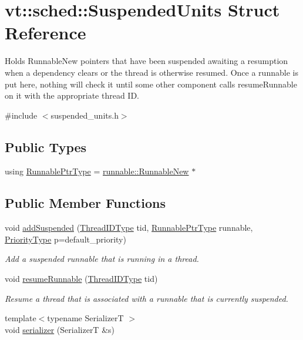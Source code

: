 \hypertarget{structvt_1_1sched_1_1_suspended_units}{}\section{vt\+:\+:sched\+:\+:Suspended\+Units Struct Reference}
\label{structvt_1_1sched_1_1_suspended_units}


Holds {\ttfamily Runnable\+New} pointers that have been suspended awaiting a resumption when a dependency clears or the thread is otherwise resumed. Once a runnable is put here, nothing will check it until some other component calls {\ttfamily resume\+Runnable} on it with the appropriate thread ID.  




{\ttfamily \#include $<$suspended\+\_\+units.\+h$>$}

\subsection*{Public Types}
\begin{DoxyCompactItemize}
\item 
using \hyperlink{structvt_1_1sched_1_1_suspended_units_a676693336c5e9f93da33338945a2ec6c}{Runnable\+Ptr\+Type} = \hyperlink{structvt_1_1runnable_1_1_runnable_new}{runnable\+::\+Runnable\+New} $\ast$
\end{DoxyCompactItemize}
\subsection*{Public Member Functions}
\begin{DoxyCompactItemize}
\item 
void \hyperlink{structvt_1_1sched_1_1_suspended_units_af98ef20b8bf4e914b673a50c3d3a83ba}{add\+Suspended} (\hyperlink{namespacevt_a9b887d814dd25ff495a0c8270304ac02}{Thread\+I\+D\+Type} tid, \hyperlink{structvt_1_1sched_1_1_suspended_units_a676693336c5e9f93da33338945a2ec6c}{Runnable\+Ptr\+Type} runnable, \hyperlink{namespacevt_a86bff9f556eb761b27fc8600d006ac04}{Priority\+Type} p=default\+\_\+priority)
\begin{DoxyCompactList}\small\item\em Add a suspended runnable that is running in a thread. \end{DoxyCompactList}\item 
void \hyperlink{structvt_1_1sched_1_1_suspended_units_a9c6e5accda32f30bf5541fe1f6be7d05}{resume\+Runnable} (\hyperlink{namespacevt_a9b887d814dd25ff495a0c8270304ac02}{Thread\+I\+D\+Type} tid)
\begin{DoxyCompactList}\small\item\em Resume a thread that is associated with a runnable that is currently suspended. \end{DoxyCompactList}\item 
{\footnotesize template$<$typename SerializerT $>$ }\\void \hyperlink{structvt_1_1sched_1_1_suspended_units_a849db2cdb3218a3c0221b21b6c0defad}{serializer} (SerializerT \&s)
\end{DoxyCompactItemize}
